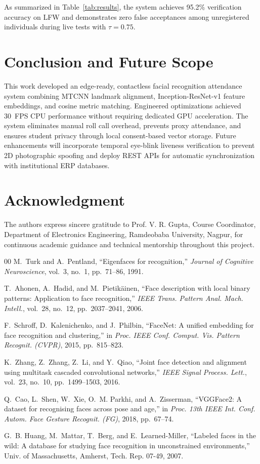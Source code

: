\documentclass[conference]{IEEEtran}
\begin{document}
As summarized in Table~\ref{tab:results}, the system achieves 95.2\% verification accuracy on LFW and demonstrates zero false acceptances among unregistered individuals during live tests with $\tau = 0.75$.

\section{Conclusion and Future Scope}
This work developed an edge-ready, contactless facial recognition attendance system combining MTCNN landmark alignment, Inception-ResNet-v1 feature embeddings, and cosine metric matching. Engineered optimizations achieved 30~FPS CPU performance without requiring dedicated GPU acceleration. The system eliminates manual roll call overhead, prevents proxy attendance, and ensures student privacy through local consent-based vector storage. Future enhancements will incorporate temporal eye-blink liveness verification to prevent 2D photographic spoofing and deploy REST APIs for automatic synchronization with institutional ERP databases.

\section*{Acknowledgment}
The authors express sincere gratitude to Prof. V. R. Gupta, Course Coordinator, Department of Electronics Engineering, Ramdeobaba University, Nagpur, for continuous academic guidance and technical mentorship throughout this project.

\begin{thebibliography}{00}
M.~Turk and A.~Pentland, ``Eigenfaces for recognition,'' \textit{Journal of Cognitive Neuroscience}, vol.~3, no.~1, pp.~71--86, 1991.

T.~Ahonen, A.~Hadid, and M.~Pietik{\"a}inen, ``Face description with local binary patterns: Application to face recognition,'' \textit{IEEE Trans. Pattern Anal. Mach. Intell.}, vol.~28, no.~12, pp.~2037--2041, 2006.

F.~Schroff, D.~Kalenichenko, and J.~Philbin, ``FaceNet: A unified embedding for face recognition and clustering,'' in \textit{Proc. IEEE Conf. Comput. Vis. Pattern Recognit. (CVPR)}, 2015, pp.~815--823.

K.~Zhang, Z.~Zhang, Z.~Li, and Y.~Qiao, ``Joint face detection and alignment using multitask cascaded convolutional networks,'' \textit{IEEE Signal Process. Lett.}, vol.~23, no.~10, pp.~1499--1503, 2016.

Q.~Cao, L.~Shen, W.~Xie, O.~M. Parkhi, and A.~Zisserman, ``VGGFace2: A dataset for recognising faces across pose and age,'' in \textit{Proc. 13th IEEE Int. Conf. Autom. Face Gesture Recognit. (FG)}, 2018, pp.~67--74.

G.~B. Huang, M.~Mattar, T.~Berg, and E.~Learned-Miller, ``Labeled faces in the wild: A database for studying face recognition in unconstrained environments,'' Univ. of Massachusetts, Amherst, Tech. Rep. 07-49, 2007.
\end{thebibliography}
\end{document}

